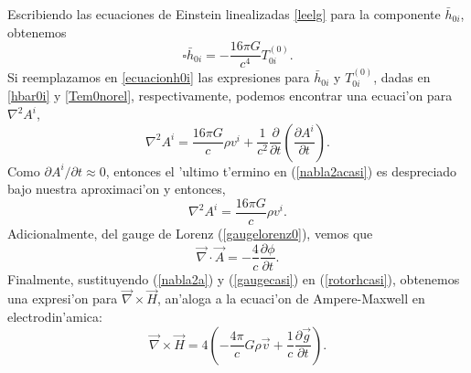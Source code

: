 Escribiendo las ecuaciones de Einstein linealizadas \eqref{leelg} para la componente $\bar{h}_{0i}$, obtenemos
\begin{equation}
\square \bar{h}_{0i}=-\frac{16\pi G}{c^4}T_{0i}^{(0)}.\label{ecuacionh0i}
\end{equation}
Si reemplazamos en \eqref{ecuacionh0i} las expresiones para $\bar{h}_{0i}$ y $T_{0i}^{(0)}$, dadas en \eqref{hbar0i} y \eqref{Tem0norel}, respectivamente, podemos encontrar una ecuaci'on para ${\nabla}^2A^i$,
\begin{equation}
{\nabla}^2A^i=\frac{16\pi G}{c}\rho v^i+\frac{1}{c^2}\frac{\partial}{\partial t}\left(\frac{\partial A^i}{\partial t}\right).\label{nabla2acasi}
\end{equation}
Como $\partial A^i/\partial t\approx0$, entonces el 'ultimo t'ermino en (\ref{nabla2acasi}) es despreciado bajo nuestra aprox\-imaci'on y entonces,
\begin{equation}
{\nabla}^2A^i=\frac{16\pi G}{c}\rho v^i.\label{nabla2a}
\end{equation}
Adicionalmente, del gauge de Lorenz (\ref{gaugelorenz0}), vemos que
\begin{equation}
\vec{\nabla}\cdot\vec{A}=-\frac{4}{c}\frac{\partial \phi}{\partial t}.\label{gaugecasi}
\end{equation}
Finalmente, sustituyendo (\ref{nabla2a}) y (\ref{gaugecasi}) en (\ref{rotorhcasi}), obtenemos una expresi'on para $\vec{\nabla}\times\vec{H}$, an'aloga a la ecuaci'on de Ampere-Maxwell en electrodin'amica:
\begin{equation}
\vec{\nabla}\times\vec{H}=4\left(-\frac{4\pi}{c}G\rho \vec{v}+\frac{1}{c}\frac{\partial \vec{g}}{\partial t}\right).
\end{equation}

